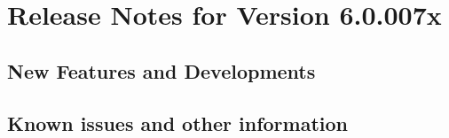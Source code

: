 \makeatletter
\section{Release Notes for Version 6.0.007x}
\makeatother

\subsection{New Features and Developments}


\subsection{Known issues and other information}

